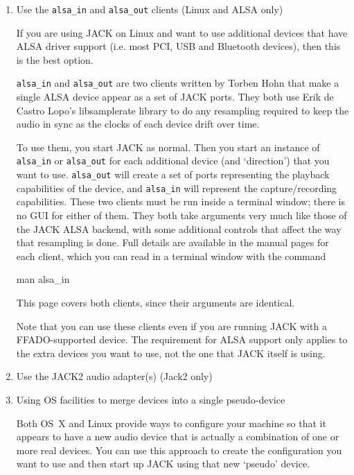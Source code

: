 \documentclass[10pt,a4paper]{book}
\begin{document}
\begin{enumerate}

\item Use the \texttt{alsa\_in} and \texttt{alsa\_out} clients (Linux and ALSA only)

If you are using JACK on Linux and want to use additional devices that
have ALSA driver support (i.e. most PCI, USB and Bluetooth devices),
then this is the best option.

\texttt{alsa\_in} and \texttt{alsa\_out} are two clients written by
Torben Hohn that make a single ALSA device appear as a set
of JACK ports. They both use Erik de Castro Lopo's libsamplerate
library to do any resampling required to keep the audio in sync as the
clocks of each device drift over time.

To use them, you start JACK as normal. Then you start an instance of
\texttt{alsa\_in} or \texttt{alsa\_out} for each additional device
(and `direction') that you want to use. \texttt{alsa\_out} will create
a set of ports representing the playback capabilities of the device,
and \texttt{alsa\_in} will represent the capture/recording
capabilities. These two clients must be run inside a terminal window; 
there is no GUI for either of them. They both take arguments very much
like those of the JACK ALSA backend, with some additional controls
that affect the way that resampling is done. Full details are
available in the manual pages for each client, which you can read in a
terminal window with the command

\begin{listing}
man alsa\_in
\end{listing}

This page covers both clients, since their arguments are identical.

Note that you can use these clients even if you are running JACK with
a FFADO-supported device. The requirement for ALSA support only
applies to the extra devices you want to use, not the one that JACK
itself is using.

\item Use the JACK2 audio adapter(s) (Jack2 only)


\item Using OS facilities to merge devices into a single pseudo-device

Both OS~X and Linux provide ways to configure your machine so that it
appears to have a new audio device that is actually a combination of
one or more real devices. You can use this approach to create the
configuration you want to use and then start up JACK using that new
`pseudo' device.


\end{enumerate}
\end{document}
